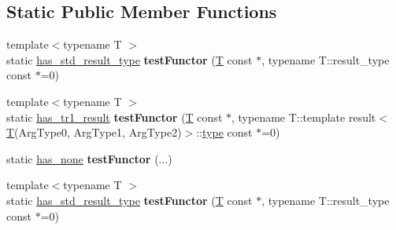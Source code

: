 \subsection*{Static Public Member Functions}
\begin{DoxyCompactItemize}
\item 
\mbox{\label{struct_eigen_1_1internal_1_1result__of_3_01_func_07_arg_type0_00_01_arg_type1_00_01_arg_type2_08_4_a0466468ea1c62ed6ccc58224b9f32339}} 
{\footnotesize template$<$typename T $>$ }\\static \hyperlink{struct_eigen_1_1internal_1_1has__std__result__type}{has\+\_\+std\+\_\+result\+\_\+type} {\bfseries test\+Functor} (\hyperlink{group___sparse_core___module}{T} const $\ast$, typename T\+::result\+\_\+type const $\ast$=0)
\item 
\mbox{\label{struct_eigen_1_1internal_1_1result__of_3_01_func_07_arg_type0_00_01_arg_type1_00_01_arg_type2_08_4_ae02c3ef769fda8c4585f3261306030b7}} 
{\footnotesize template$<$typename T $>$ }\\static \hyperlink{struct_eigen_1_1internal_1_1has__tr1__result}{has\+\_\+tr1\+\_\+result} {\bfseries test\+Functor} (\hyperlink{group___sparse_core___module}{T} const $\ast$, typename T\+::template result$<$ \hyperlink{group___sparse_core___module}{T}(Arg\+Type0, Arg\+Type1, Arg\+Type2)$>$\+::\hyperlink{group___sparse_core___module}{type} const $\ast$=0)
\item 
\mbox{\label{struct_eigen_1_1internal_1_1result__of_3_01_func_07_arg_type0_00_01_arg_type1_00_01_arg_type2_08_4_a9ab5bd241cc11f5e5207c107c628fc28}} 
static \hyperlink{struct_eigen_1_1internal_1_1has__none}{has\+\_\+none} {\bfseries test\+Functor} (...)
\item 
\mbox{\label{struct_eigen_1_1internal_1_1result__of_3_01_func_07_arg_type0_00_01_arg_type1_00_01_arg_type2_08_4_a0466468ea1c62ed6ccc58224b9f32339}} 
{\footnotesize template$<$typename T $>$ }\\static \hyperlink{struct_eigen_1_1internal_1_1has__std__result__type}{has\+\_\+std\+\_\+result\+\_\+type} {\bfseries test\+Functor} (\hyperlink{group___sparse_core___module}{T} const $\ast$, typename T\+::result\+\_\+type const $\ast$=0)

\end{DoxyCompactItemize}
